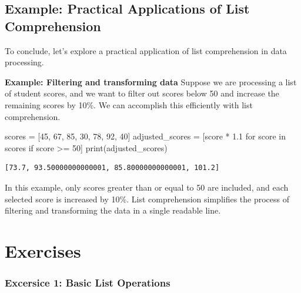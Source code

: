 \documentclass[
  letterpaper,
  DIV=11,
  numbers=noendperiod]{scrreprt}
\newenvironment{Shaded}{\begin{snugshade}}{\end{snugshade}}
\newcommand{\BuiltInTok}[1]{\textcolor[rgb]{0.00,0.23,0.31}{#1}}
\newcommand{\ControlFlowTok}[1]{\textcolor[rgb]{0.00,0.23,0.31}{#1}}
\newcommand{\DecValTok}[1]{\textcolor[rgb]{0.68,0.00,0.00}{#1}}
\newcommand{\FloatTok}[1]{\textcolor[rgb]{0.68,0.00,0.00}{#1}}
\newcommand{\KeywordTok}[1]{\textcolor[rgb]{0.00,0.23,0.31}{#1}}
\newcommand{\NormalTok}[1]{\textcolor[rgb]{0.00,0.23,0.31}{#1}}
\newcommand{\OperatorTok}[1]{\textcolor[rgb]{0.37,0.37,0.37}{#1}}
\begin{document}
\hypertarget{example-practical-applications-of-list-comprehension}{%
\subsection{Example: Practical Applications of List
Comprehension}\label{example-practical-applications-of-list-comprehension}}

To conclude, let's explore a practical application of list comprehension
in data processing.

\textbf{Example: Filtering and transforming data} Suppose we are
processing a list of student scores, and we want to filter out scores
below 50 and increase the remaining scores by 10\%. We can accomplish
this efficiently with list comprehension.

\begin{Shaded}
\begin{Highlighting}[]
\NormalTok{scores }\OperatorTok{=}\NormalTok{ [}\DecValTok{45}\NormalTok{, }\DecValTok{67}\NormalTok{, }\DecValTok{85}\NormalTok{, }\DecValTok{30}\NormalTok{, }\DecValTok{78}\NormalTok{, }\DecValTok{92}\NormalTok{, }\DecValTok{40}\NormalTok{]}
\NormalTok{adjusted\_scores }\OperatorTok{=}\NormalTok{ [score }\OperatorTok{*} \FloatTok{1.1} \ControlFlowTok{for}\NormalTok{ score }\KeywordTok{in}\NormalTok{ scores }\ControlFlowTok{if}\NormalTok{ score }\OperatorTok{\textgreater{}=} \DecValTok{50}\NormalTok{]}
\BuiltInTok{print}\NormalTok{(adjusted\_scores)  }
\end{Highlighting}
\end{Shaded}

\begin{verbatim}
[73.7, 93.50000000000001, 85.80000000000001, 101.2]
\end{verbatim}

In this example, only scores greater than or equal to 50 are included,
and each selected score is increased by 10\%. List comprehension
simplifies the process of filtering and transforming the data in a
single readable line.

\hypertarget{exercises-6}{%
\section{Exercises}\label{exercises-6}}

\hypertarget{excersice-1-basic-list-operations}{%
\subsubsection{Excersice 1: Basic List
Operations}\label{excersice-1-basic-list-operations}}
\end{document}
